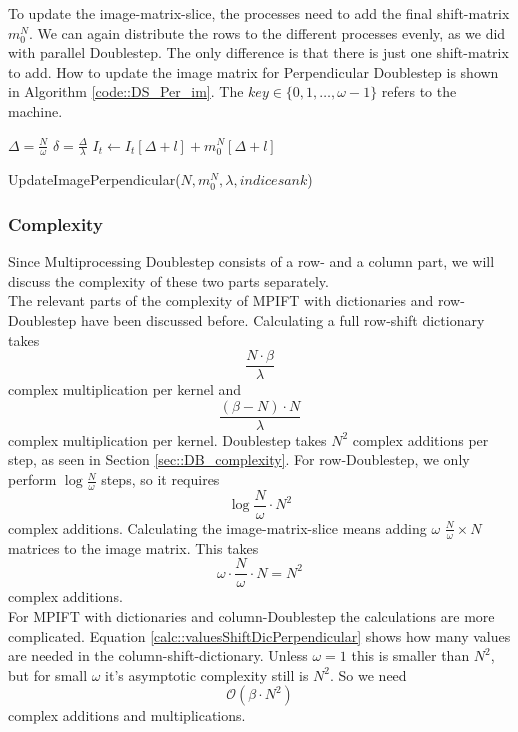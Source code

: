 \documentclass[12pt]{article}
\begin{document}
To update the image-matrix-slice, the processes need to add the final shift-matrix $m_0^N$. We can again distribute the rows to the different processes evenly, as we did with parallel Doublestep. The only difference is that there is just one shift-matrix to add. How to update the image matrix for Perpendicular Doublestep is shown in Algorithm \ref{code::DS_Per_im}. The $key\in \{0,1,\ldots,\omega-1\}$ refers to the machine.\\




\begin{algorithm}
	\begin{algorithmic}[1]
		\State $\Delta = \frac{N}{\omega}$
		\State $\delta = \frac{ \Delta}{\lambda}$
			\State $I_t \leftarrow I_t[\Delta+l]+m_0^N[\Delta+l]$
		\EndFor
	\end{algorithmic}
\caption{UpdateImagePerpendicular($N,m_0^N,  \lambda ,indicesank$)}\label{euclid}
\label{code::DS_Per_im}
\end{algorithm}

\subsubsection{Complexity}
\label{sec::MultiProsComplex}
Since Multiprocessing Doublestep consists of a row- and a column part, we will discuss the complexity of these two parts separately.\\

The relevant parts of the complexity of MPIFT with dictionaries and row-Doublestep have been discussed before. Calculating a full row-shift dictionary takes
\[
\frac{N\cdot \beta}{\lambda}
\] complex multiplication per kernel and 
\[ \frac{(\beta-N)\cdot N}{\lambda}
\] complex multiplication per kernel.
Doublestep takes $N^2$ complex additions per step, as seen in Section \ref{sec::DB_complexity}. For row-Doublestep, we only perform $\log{\frac{N}{\omega}}$ steps, so it requires 
\[
\log{\frac{N}{\omega}}\cdot N^2 
\] complex additions.
Calculating the image-matrix-slice means adding $\omega$ $\frac{N}{\omega}\times N$ matrices to the image matrix. This takes 
\[
\omega\cdot \frac{N}{\omega}\cdot N=N^2
\] complex additions.\\ 


For MPIFT with dictionaries and column-Doublestep the calculations are more complicated. Equation \eqref{calc::valuesShiftDicPerpendicular} shows how many values are needed in the column-shift-dictionary. Unless $\omega=1$ this is smaller than $N^2$, but for small $\omega$ it's asymptotic complexity still is $N^2$. So we need \[
\mathcal{O}(\beta\cdot N^2) 
\]complex additions and multiplications.
\end{document}
